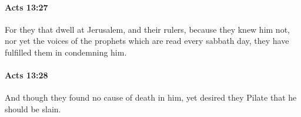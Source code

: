 		\paragraph{Acts 13:27} %
			\label{ACTS-13-27}

			For they that dwell at Jerusalem, and their rulers, because they knew him not, nor yet the voices of the prophets which are read every sabbath day, they have fulfilled them in condemning him.

			\begin{framed}
			\scriptsize
				\begin{compactdesc}
					\item[SBLG] 
				\end{compactdesc}
			\end{framed}

		\paragraph{Acts 13:28} %
			\label{ACTS-13-28}

			And though they found no cause of death in him, yet desired they Pilate that he should be slain.

